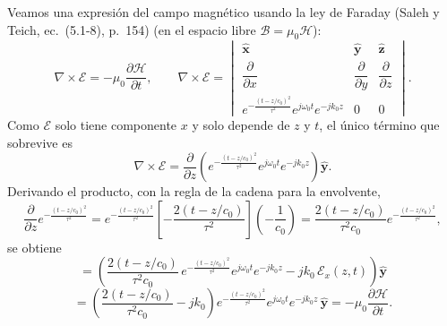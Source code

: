 \documentclass{article}
\newcommand{\Ec}{\boldsymbol{\mathcal{E}}}
\newcommand{\Hc}{\boldsymbol{\mathcal{H}}}
\newcommand{\xh}{\hat{\mathbf{x}}}
\newcommand{\yh}{\hat{\mathbf{y}}}
\newcommand{\zh}{\hat{\mathbf{z}}}
\newcommand{\env}{e^{-\frac{(t-z/c_0)^2}{\tau^2}}}
\begin{document}
Veamos una expresión del campo magnético usando la ley de Faraday (Saleh y Teich, ec.~(5.1-8), p.~154)
(en el espacio libre $\mathcal{B}=\mu_0\mathcal{H}$):
\[
\nabla\times\Ec=-\mu_0\frac{\partial\Hc}{\partial t},
\qquad
\nabla\times\Ec=
\begin{vmatrix}
\xh & \yh & \zh\\[2pt]
\dfrac{\partial}{\partial x} & \dfrac{\partial}{\partial y} & \dfrac{\partial}{\partial z}\\[8pt]
\env e^{j\omega_0t}e^{-jk_0z} & 0 & 0
\end{vmatrix}.
\]
Como $\Ec$ solo tiene componente $x$ y solo depende de $z$ y $t$, el único término que sobrevive es
\[
\nabla\times\Ec=\frac{\partial}{\partial z}\left(\env e^{j\omega_0t}e^{-jk_0z}\right)\yh .
\]
Derivando el producto, con la regla de la cadena para la envolvente,
\[
\frac{\partial}{\partial z}\env=\env\left[-\frac{2(t-z/c_0)}{\tau^2}\right]\left(-\frac{1}{c_0}\right)
=\frac{2(t-z/c_0)}{\tau^2c_0}\env ,
\]
se obtiene
\[
=\left(\frac{2(t-z/c_0)}{\tau^2c_0}\,\env e^{j\omega_0t}e^{-jk_0z}-jk_0\,\mathcal{E}_x(z,t)\right)\yh
\]
\[
=\left(\frac{2(t-z/c_0)}{\tau^2c_0}-jk_0\right)\env e^{j\omega_0t}e^{-jk_0z}\,\yh
=-\mu_0\frac{\partial\Hc}{\partial t}.
\]
\end{document}
